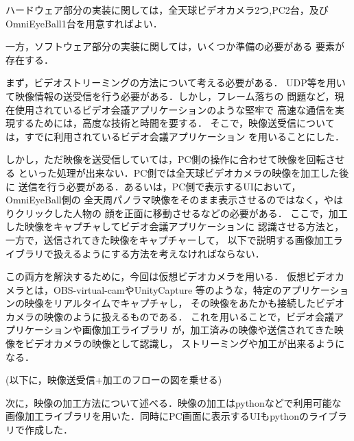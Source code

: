 ハードウェア部分の実装に関しては，全天球ビデオカメラ2つ,PC2台，及び
OmniEyeBall1台を用意すればよい．

一方，ソフトウェア部分の実装に関しては，いくつか準備の必要がある
要素が存在する．

まず，ビデオストリーミングの方法について考える必要がある．
UDP等を用いて映像情報の送受信を行う必要がある．しかし，フレーム落ちの
問題など，現在使用されているビデオ会議アプリケーションのような堅牢で
高速な通信を実現するためには，高度な技術と時間を要する．
そこで，映像送受信については，すでに利用されているビデオ会議アプリケーション
を用いることにした．

しかし，ただ映像を送受信していては，PC側の操作に合わせて映像を回転させる
といった処理が出来ない．PC側では全天球ビデオカメラの映像を加工した後に
送信を行う必要がある．あるいは，PC側で表示するUIにおいて，OmniEyeBall側の
全天周パノラマ映像をそのまま表示させるのではなく，やはりクリックした人物の
顔を正面に移動させるなどの必要がある．
ここで，加工した映像をキャプチャしてビデオ会議アプリケーションに
認識させる方法と，一方で，送信されてきた映像をキャプチャーして，
以下で説明する画像加工ライブラリで扱えるようにする方法を考えなければならない．

この両方を解決するために，今回は仮想ビデオカメラを用いる．
仮想ビデオカメラとは，OBS-virtual-cam\cite{7}やUnityCapture\cite{8}
等のような，特定のアプリケーションの映像をリアルタイムでキャプチャし，
その映像をあたかも接続したビデオカメラの映像のように扱えるものである．
これを用いることで，ビデオ会議アプリケーションや画像加工ライブラリ
が，加工済みの映像や送信されてきた映像をビデオカメラの映像として認識し，
ストリーミングや加工が出来るようになる．

(以下に，映像送受信+加工のフローの図を乗せる)

次に，映像の加工方法について述べる．映像の加工はpythonなどで利用可能な
画像加工ライブラリを用いた．同時にPC画面に表示するUIもpythonのライブラリで作成した．